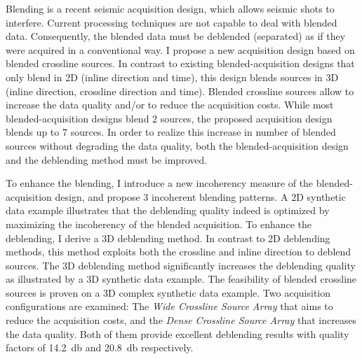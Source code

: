 \documentclass[a4paper,11pt]{mscThesis}
\begin{document}
%
\frontmatter %
%
    \maketitle
    
    \listoftodos
%
Blending is a recent seismic acquisition design, which allows seismic shots to interfere. %
Current processing techniques are not capable to deal with blended data. Consequently, the blended data must be deblended (separated) as if they were acquired in a conventional way.
I propose a new acquisition design  based on blended crossline sources. In contrast to existing blended-acquisition designs that only blend in 2D (inline direction and time), this design blends sources in 3D (inline direction, crossline direction and time). Blended crossline sources allow to increase the data quality and/or to reduce the acquisition costs. 
While most blended-acquisition designs blend 2 sources, the proposed acquisition design blends up to 7 sources. In order to realize this increase in number of blended sources without degrading the data quality, both the blended-acquisition design and the deblending method must be improved.

To enhance the blending, I introduce a new incoherency measure of the blended-acquisition design, and propose 3 incoherent blending patterns. A 2D synthetic data example illustrates that the deblending quality indeed is optimized by maximizing the incoherency of the blended acquisition.
To enhance the deblending, I derive a 3D deblending method. In contrast to 2D deblending methods, this method exploits both the crossline and inline direction to deblend sources. The 3D deblending method significantly increases the deblending quality as illustrated by a 3D synthetic data example.
The feasibility of blended crossline sources is proven on a 3D complex synthetic data example. Two acquisition configurations are examined: The \textit{Wide Crossline Source Array} that aims to reduce the acquisition costs, and the \textit{Dense Crossline Source Array} that increases the data quality. Both of them provide excellent deblending results with quality factors of \SI{14.2}{\decibel} and \SI{20.8}{\decibel} respectively.

\end{document}
